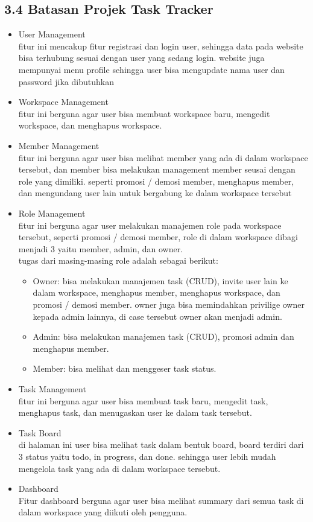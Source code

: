 \subsection*{3.4 Batasan Projek Task Tracker}
\begin{itemize}
    \item User Management \\
    fitur ini mencakup fitur registrasi dan login user, sehingga data pada website bisa terhubung sesuai dengan user yang sedang login.
    website juga mempunyai menu profile sehingga user bisa mengupdate nama user dan password jika dibutuhkan
    \item Workspace Management \\
    fitur ini berguna agar user bisa membuat workspace baru, mengedit workspace, dan menghapus workspace.
    \item Member Management \\
    fitur ini berguna agar user bisa melihat member yang ada di dalam workspace tersebut, dan member bisa melakukan management member seusai dengan role yang dimiliki.
    seperti promosi / demosi member, menghapus member, dan mengundang user lain untuk bergabung ke dalam workspace tersebut
    \item Role Management \\
    fitur ini berguna agar user melakukan manajemen role pada workspace tersebut, seperti promosi / demosi member, role di dalam workspace dibagi menjadi 3 yaitu member, admin, dan owner.
    \\ tugas dari masing-masing role adalah sebagai berikut:
    \begin{itemize}
      \item Owner: bisa melakukan manajemen task (CRUD), invite user lain ke dalam workspace, menghapus member, menghapus workspace, dan promosi / demosi member.
      owner juga bisa memindahkan privilige owner kepada admin lainnya, di case tersebut owner akan menjadi admin.
      \item Admin: bisa melakukan manajemen task (CRUD), promosi admin dan menghapus member.
      \item Member: bisa melihat dan menggeser task status.
    \end{itemize}
    \item Task Management \\
    fitur ini berguna agar user bisa membuat task baru, mengedit task, menghapus task, dan menugaskan user ke dalam task tersebut.
    \item Task Board \\
    di halaman ini user bisa melihat task dalam bentuk board, board terdiri dari 3 status yaitu todo, in progress, dan done. 
    sehingga user lebih mudah mengelola task yang ada di dalam workspace tersebut.
    \item Dashboard \\
    Fitur dashboard berguna agar user bisa melihat summary dari semua task di dalam workspace yang diikuti oleh pengguna.
\end{itemize}

